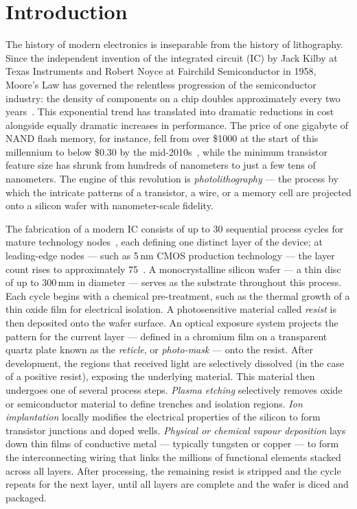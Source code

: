 \def\baselinestretch{1}

\chapter{Introduction}\label{ch:introduction}

\def\baselinestretch{1.66}

The history of modern electronics is inseparable from the history of lithography. Since the independent invention of the integrated circuit (IC) by Jack Kilby at Texas Instruments and Robert Noyce at Fairchild Semiconductor in 1958, Moore's Law has governed the relentless progression of the semiconductor industry: the density of components on a chip doubles approximately every two years~\cite{Schmidt2012_UltraPrecision}. This exponential trend has translated into dramatic reductions in cost alongside equally dramatic increases in performance. The price of one gigabyte of NAND flash memory, for instance, fell from over \$1000 at the start of this millennium to below \$0.30 by the mid-2010s~\cite{Butler2011_PositionControl}, while the minimum transistor feature size has shrunk from hundreds of nanometers to just a few tens of nanometers. The engine of this revolution is \textit{photolithography} — the process by which the intricate patterns of a transistor, a wire, or a memory cell are projected onto a silicon wafer with nanometer-scale fidelity.

The fabrication of a modern IC consists of up to 30 sequential process cycles for mature technology nodes~\cite{Schmidt2012_UltraPrecision}, each defining one distinct layer of the device; at leading-edge nodes --- such as 5\,nm CMOS production technology --- the layer count rises to approximately 75~\cite{Yeap2019_5nmCMOS, McLellan2019_IEDM3}. A monocrystalline silicon wafer — a thin disc of up to 300\,mm in diameter — serves as the substrate throughout this process. Each cycle begins with a chemical pre-treatment, such as the thermal growth of a thin oxide film for electrical isolation. A photosensitive material called \textit{resist} is then deposited onto the wafer surface. An optical exposure system projects the pattern for the current layer — defined in a chromium film on a transparent quartz plate known as the \textit{reticle}, or \textit{photo-mask} — onto the resist. After development, the regions that received light are selectively dissolved (in the case of a positive resist), exposing the underlying material. This material then undergoes one of several process steps. \textit{Plasma etching} selectively removes oxide or semiconductor material to define trenches and isolation regions. \textit{Ion implantation} locally modifies the electrical properties of the silicon to form transistor junctions and doped wells. \textit{Physical or chemical vapour deposition} lays down thin films of conductive metal — typically tungsten or copper — to form the interconnecting wiring that links the millions of functional elements stacked across all layers. After processing, the remaining resist is stripped and the cycle repeats for the next layer, until all layers are complete and the wafer is diced and packaged.

